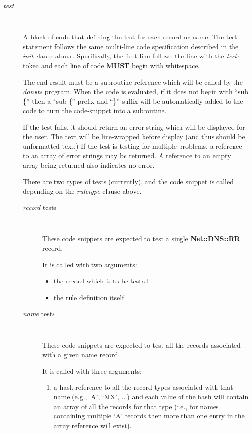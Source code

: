 \begin{description}
\item [{\it test}]\verb" "

A block of code that defining the test for each record or name.
The test statement follows the same multi-line code specification
described in the {\it init} clause above.  Specifically, the first line
follows the line with the {\it test:} token and each line of code {\bf MUST}
begin with whitespace.

The end result must be a subroutine reference which will be called by
the {\it donuts} program.  When the code is evaluated, if it does not
begin with ``sub \{'' then a ``sub \{'' prefix and ``\}'' suffix will be
automatically added to the code to turn the code-snippet into a
subroutine.

If the test fails, it should return an error string which will be displayed
for the user.  The text will be line-wrapped before display (and thus should
be unformatted text.)  If the test is testing for multiple problems, a
reference to an array of error strings may be returned.  A reference to an
empty array being returned also indicates no error.

There are two types of tests (currently), and the code snippet is
called depending on the {\it ruletype} clause above.

\begin{description}

\item [{\it record} tests]\verb" "

These code snippets are expected to test a single {\bf Net::DNS::RR} record.

It is called with two arguments:

\begin{itemize}
\item the record which is to be tested
\item the rule definition itself.
\end{itemize}

\item [{\it name} tests]\verb" "

These code snippets are expected to test all the records
associated with a given name record.

It is called with three arguments:

\begin{enumerate}
\item a hash reference to all the record types associated
     with that name (e.g., `A', `MX', ...) and each value of
     the hash will contain an array of all the records for
     that type (i.e., for names containing multiple `A'
     records then more than one entry in the array reference
     will exist).


\end{enumerate}
\end{description}
\end{description}
